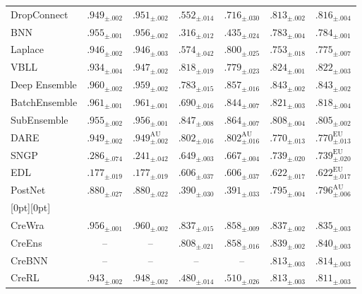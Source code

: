\begin{table}[t]
\begin{tabular}{@{}l cc cc cc@{}}
DropConnect & $.949_{\pm .002}$ & $.951_{\pm .002}$ & $.552_{\pm .014}$ & $.716_{\pm .030}$ & $.813_{\pm .002}$ & $.816_{\pm .004}$ \\
BNN & $.955_{\pm .001}$ & $.956_{\pm .002}$ & $.316_{\pm .012}$ & $.435_{\pm .024}$ & $.783_{\pm .004}$ & $.784_{\pm .001}$ \\
Laplace & $.946_{\pm .002}$ & $.946_{\pm .003}$ & $.574_{\pm .042}$ & $.800_{\pm .025}$ & $.753_{\pm .018}$ & $.775_{\pm .007}$ \\
VBLL & $.934_{\pm .004}$ & $.947_{\pm .002}$ & $.818_{\pm .019}$ & $.779_{\pm .023}$ & $.824_{\pm .001}$ & $.822_{\pm .003}$ \\
Deep Ensemble & $.960_{\pm .002}$ & $.959_{\pm .002}$ & $.783_{\pm .015}$ & $.857_{\pm .016}$ & $\mathbf{.843_{\pm .002}}$ & $\mathbf{.843_{\pm .002}}$ \\
BatchEnsemble & $.961_{\pm .001}$ & $.961_{\pm .001}$ & $.690_{\pm .016}$ & $.844_{\pm .007}$ & $.821_{\pm .003}$ & $.818_{\pm .004}$ \\
SubEnsemble & $.955_{\pm .002}$ & $.956_{\pm .001}$ & $.847_{\pm .008}$ & $.864_{\pm .007}$ & $.808_{\pm .004}$ & $.805_{\pm .002}$ \\
DARE & $.949_{\pm .002}$ & $.949_{\pm .002}^{\mathrm{AU}}$ & $.802_{\pm .016}$ & $.802_{\pm .016}^{\mathrm{AU}}$ & $.770_{\pm .013}$ & $.770_{\pm .013}^{\mathrm{EU}}$ \\
SNGP & $.286_{\pm .074}$ & $.241_{\pm .042}$ & $.649_{\pm .003}$ & $.667_{\pm .004}$ & $.739_{\pm .020}$ & $.739_{\pm .020}^{\mathrm{EU}}$ \\
EDL & $.177_{\pm .019}$ & $.177_{\pm .019}$ & $.606_{\pm .037}$ & $.606_{\pm .037}$ & $.622_{\pm .017}$ & $.622_{\pm .017}^{\mathrm{EU}}$ \\
PostNet & $.880_{\pm .027}$ & $.880_{\pm .022}$ & $.390_{\pm .030}$ & $.391_{\pm .033}$ & $.795_{\pm .004}$ & $.796_{\pm .006}^{\mathrm{AU}}$ \\
\addlinespace[0.4em]
\rowcolor[gray]{0.92}[0pt][0pt]
\multicolumn{7}{@{}l@{}}{\textbf{Credal}} \\
\addlinespace[0.15em]
CreWra & $.956_{\pm .001}$ & $.960_{\pm .002}$ & $.837_{\pm .015}$ & $.858_{\pm .009}$ & $.837_{\pm .002}$ & $.835_{\pm .003}$ \\
CreEns & -- & -- & $.808_{\pm .021}$ & $.858_{\pm .016}$ & $.839_{\pm .002}$ & $.840_{\pm .003}$ \\
CreBNN & -- & -- & -- & -- & $.813_{\pm .003}$ & $.814_{\pm .003}$ \\
CreRL & $.943_{\pm .002}$ & $.948_{\pm .002}$ & $.480_{\pm .014}$ & $.510_{\pm .026}$ & $.813_{\pm .003}$ & $.811_{\pm .003}$ \\

\end{tabular}
\end{table}
